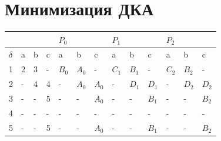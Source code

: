 \documentclass[12pt,onecolumn]{article}
\begin{document}
\section*{Минимизация ДКА}
\begin{table}[H]
    \begin{tabular}{|llll|lll|lll|lll|}
    \hline
    \multicolumn{4}{|l|}{}                                                                  & \multicolumn{3}{l|}{$P_0$}                             & \multicolumn{3}{l|}{$P_1$}                             & \multicolumn{3}{l|}{$P_2$}                             \\ \hline
    \multicolumn{1}{|l|}{$\delta$} & \multicolumn{1}{l|}{a} & \multicolumn{1}{l|}{b} & c & \multicolumn{1}{l|}{a}  & \multicolumn{1}{l|}{b}  & c  & \multicolumn{1}{l|}{a}  & \multicolumn{1}{l|}{b}  & c  & \multicolumn{1}{l|}{a}  & \multicolumn{1}{l|}{b}  & c  \\ \hline
    \multicolumn{1}{|l|}{1}           & \multicolumn{1}{l|}{2} & \multicolumn{1}{l|}{3} & - & \multicolumn{1}{l|}{$B_0$} & \multicolumn{1}{l|}{$A_0$} & -  & \multicolumn{1}{l|}{$C_1$} & \multicolumn{1}{l|}{$B_1$} & -  & \multicolumn{1}{l|}{$C_2$} & \multicolumn{1}{l|}{$B_2$} & -  \\ \hline
    \multicolumn{1}{|l|}{2}           & \multicolumn{1}{l|}{-} & \multicolumn{1}{l|}{4} & 4 & \multicolumn{1}{l|}{-}  & \multicolumn{1}{l|}{$A_0$} & $A_0$ & \multicolumn{1}{l|}{-}  & \multicolumn{1}{l|}{$D_1$} & $D_1$ & \multicolumn{1}{l|}{-}  & \multicolumn{1}{l|}{$D_2$} & $D_2$ \\ \hline
    \multicolumn{1}{|l|}{3}           & \multicolumn{1}{l|}{-} & \multicolumn{1}{l|}{-} & 5 & \multicolumn{1}{l|}{-}  & \multicolumn{1}{l|}{-}  & $A_0$ & \multicolumn{1}{l|}{-}  & \multicolumn{1}{l|}{-}  & $B_1$ & \multicolumn{1}{l|}{-}  & \multicolumn{1}{l|}{-}  & $B_2$ \\ \hline
    \multicolumn{1}{|l|}{4}           & \multicolumn{1}{l|}{-} & \multicolumn{1}{l|}{-} & - & \multicolumn{1}{l|}{-}  & \multicolumn{1}{l|}{-}  & -  & \multicolumn{1}{l|}{-}  & \multicolumn{1}{l|}{-}  & -  & \multicolumn{1}{l|}{-}  & \multicolumn{1}{l|}{-}  & -  \\ \hline
    \multicolumn{1}{|l|}{5}           & \multicolumn{1}{l|}{-} & \multicolumn{1}{l|}{-} & 5 & \multicolumn{1}{l|}{-}  & \multicolumn{1}{l|}{-}  & $A_0$ & \multicolumn{1}{l|}{-}  & \multicolumn{1}{l|}{-}  & $B_1$ & \multicolumn{1}{l|}{-}  & \multicolumn{1}{l|}{-}  & $B_2$ \\ \hline
    \end{tabular}
    \end{table}
\end{document}
